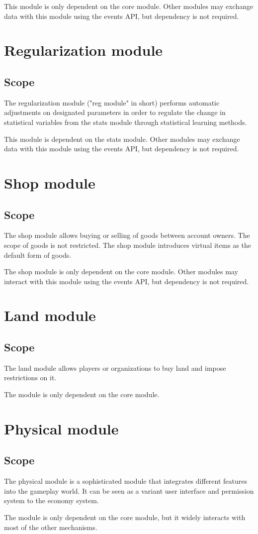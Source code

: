 \documentclass{report}
\begin{document}
			This module is only dependent on the core module.
			Other modules may exchange data with this module using the events API,
			but dependency is not required.

	\part{Regularization module}
		\chapter{Scope}

			The regularization module ("reg module" in short) performs automatic adjustments on designated parameters
			in order to regulate the change in statistical variables from the stats module through statistical learning methods.

			This module is dependent on the stats module.
			Other modules may exchange data with this module using the events API,
			but dependency is not required.

	\part{Shop module}
		\chapter{Scope}

			The shop module allows buying or selling of goods between account owners.
			The scope of goods is not restricted.
			The shop module introduces virtual items as the default form of goods.

			The shop module is only dependent on the core module.
			Other modules may interact with this module using the events API,
			but dependency is not required.

	\part{Land module}
		\chapter{Scope}

			The land module allows players or organizations to buy land and impose restrictions on it.

			The module is only dependent on the core module.

	\part{Physical module}
		\chapter{Scope}
			The physical module is a sophisticated module that integrates different features into the gameplay world.
			It can be seen as a variant user interface and permission system to the economy system.

			The module is only dependent on the core module, but it widely interacts with most of the other mechanisms.
\end{document}
